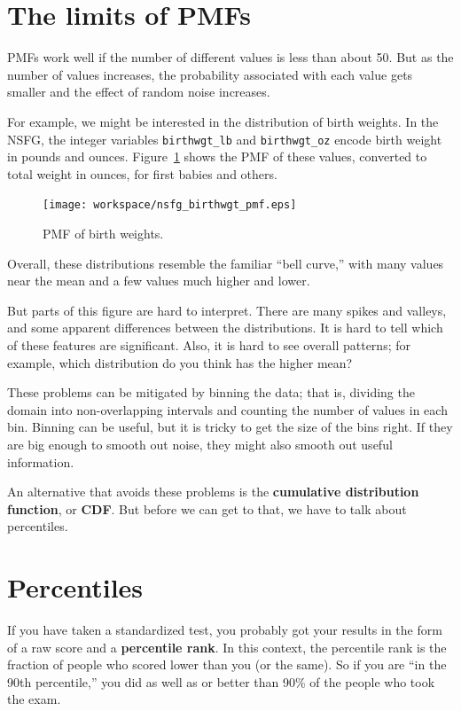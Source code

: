 \documentclass[12pt]{book}
\begin{document}
\section{The limits of PMFs}

PMFs work well if the number of different values is less than
about 50.  But as the number of values increases, the probability
associated with each value gets smaller and the effect of random noise
increases.

For example, we might be interested in the distribution of birth
weights.  In the NSFG, the integer variables \verb"birthwgt_lb" and
\verb"birthwgt_oz" encode birth weight in pounds and ounces.
Figure~\ref{nsfg_birthwgt_pmf} shows the PMF of these values,
converted to total weight in ounces, for first babies and others.

\begin{figure}
\centerline{\texttt{[image: workspace/nsfg\_birthwgt\_pmf.eps]}}
\caption{PMF of birth weights.}
\label{nsfg_birthwgt_pmf}
\end{figure}

Overall, these distributions resemble the familiar ``bell curve,'' with
many values near the mean and a few values much higher and lower.

But parts of this figure are hard to interpret.  There are many spikes
and valleys, and some apparent differences between the distributions.
It is hard to tell which of these features are significant.  Also, it
is hard to see overall patterns; for example, which distribution do
you think has the higher mean?

These problems can be mitigated by binning the data;
that is, dividing the domain into non-overlapping intervals and counting
the number of values in each bin.  Binning can be useful, but it is
tricky to get the size of the bins right.  If they are big enough to
smooth out noise, they might also smooth out useful information.

An alternative that avoids these problems is the {\bf cumulative
distribution function}, or {\bf CDF}.  But before we can get to that,
we have to talk about percentiles.


\section{Percentiles}

If you have taken a standardized test, you probably got your
results in the form of a raw score and a {\bf percentile rank}.
In this context, the percentile rank is the fraction of people who
scored lower than you (or the same).  So if you are ``in the 90th
percentile,'' you did as well as or better than 90\% of the people who
took the exam.
\end{document}
